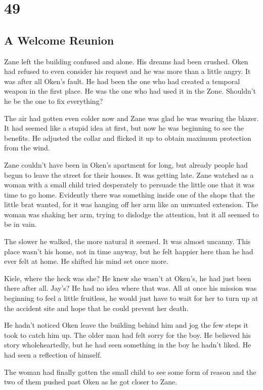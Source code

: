\chapter{49}
\section{A Welcome Reunion}


Zane left the building confused and alone.  His dreams had been crushed.  Oken had refused to even consider his request and he was more than a little angry.  It was after all Oken's fault.  He had been the one who had created a temporal weapon in the first place.  He was the one who had used it in the Zone.  Shouldn't he be the one to fix everything?

The air had gotten even colder now and Zane was glad he was wearing the blazer.  It had seemed like a stupid idea at first, but now he was beginning to see the benefits.  He adjusted the collar and flicked it up to obtain maximum protection from the wind.

Zane couldn't have been in Oken's apartment for long, but already people had begun to leave the street for their houses.  It was getting late.  Zane watched as a woman with a small child tried desperately to persuade the little one that it was time to go home.  Evidently there was something inside one of the shops that the little brat wanted, for it was hanging off her arm like an unwanted extension.  The woman was shaking her arm, trying to dislodge the attention, but it all seemed to be in vain.

The slower he walked, the more natural it seemed.  It was almost uncanny.  This place wasn't his home, not in time anyway, but he felt happier here than he had ever felt at home.  He shifted his mind set once more.  

Kiele, where the heck was she?  He knew she wasn't at Oken's, he had just been there after all.  Jay's?  He had no idea where that was.  All at once his mission was beginning to feel a little fruitless, he would just have to wait for her to turn up at the accident site and hope that he could prevent her death.

He hadn't noticed Oken leave the building behind him and jog the few steps it took to catch him up.  The older man had felt sorry for the boy.  He believed his story wholeheartedly, but he had seen something in the boy he hadn't liked.  He had seen a reflection of himself.  

The woman had finally gotten the small child to see some form of reason and the two of them pushed past Oken as he got closer to Zane.

